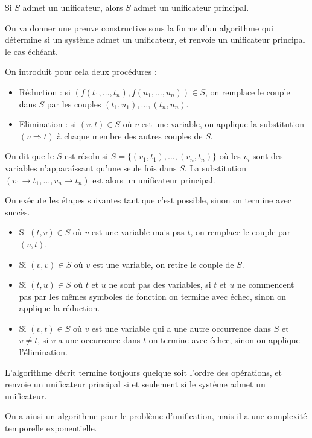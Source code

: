 \documentclass[a4paper]{article}
\begin{document}
\begin{theorem}
  Si $S$ admet un unificateur, alors $S$ admet un unificateur principal.
\end{theorem}

On va donner une preuve constructive sous la forme d'un algorithme qui détermine si un système admet un unificateur, et renvoie un unificateur principal le cas échéant.

On introduit pour cela deux procédures :
\begin{itemize}
\item Réduction : si $(f(t_1,\dots,t_n),f(u_1,\dots,u_n)) \in S$, on remplace le couple dans $S$ par les couples $(t_1,u_1),\dots,(t_n,u_n)$.
\item Elimination : si $(v,t) \in S$ où $v$ est une variable, on applique la substitution $(v\Rightarrow t)$ à chaque membre des autres couples de $S$.
\end{itemize}

On dit que le $S$ est résolu si $S = \{(v_1,t_1),\dots,(v_n,t_n)\}$ où les $v_i$ sont des variables n'apparaîssant qu'une seule fois dans $S$. La substitution $(v_1\rightarrow t_1,\dots,v_n\rightarrow t_n)$ est alors un unificateur principal.

On exécute les étapes suivantes tant que c'est possible, sinon on termine avec succès.
\begin{itemize}
\item Si $(t,v)\in S$ où $v$ est une variable mais pas $t$, on remplace le couple par $(v,t)$.
\item Si $(v,v)\in S$ où $v$ est une variable, on retire le couple de $S$.
\item Si $(t,u)\in S$ où $t$ et $u$ ne sont pas des variables, si $t$ et $u$ ne commencent pas par les mêmes symboles de fonction on termine avec échec, sinon on applique la réduction.
\item Si $(v,t)\in S$ où $v$ est une variable qui a une autre occurrence dans $S$ et $v\neq t$, si $v$ a une occurrence dans $t$ on termine avec échec, sinon on applique l'élimination.
\end{itemize}

\begin{theorem}
  L'algorithme décrit termine toujours quelque soit l'ordre des opérations, et renvoie un unificateur principal si et seulement si le système admet un unificateur.
\end{theorem}

On a ainsi un algorithme pour le problème d'unification, mais il a une complexité temporelle exponentielle.
\end{document}
